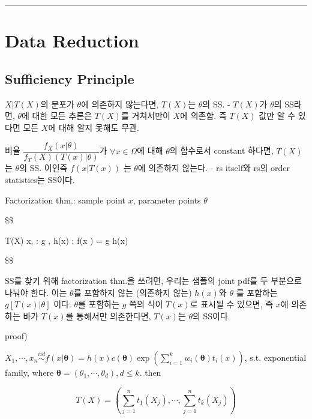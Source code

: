 \documentclass[
]{book}
\begin{document}
\begin{center}\rule{0.5\linewidth}{0.5pt}\end{center}

\hypertarget{data-reduction}{%
\section{Data Reduction}\label{data-reduction}}

\hypertarget{sufficiency-principle}{%
\subsection{Sufficiency Principle}\label{sufficiency-principle}}

\(X \vert T(X)\)의 분포가 \(\theta\)에 의존하지 않는다면, \(T(X)\)는 \(\theta\)의 SS.
- \(T(X)\)가 \(\theta\)의 SS라면, \(\theta\)에 대한 모든 추론은 \(T(X)\)를 거쳐서만이 \(X\)에 의존함. 즉 \(T(X)\) 값만 알 수 있다면 모든 \(X\)에 대해 알지 못해도 무관.

비율 \(\dfrac{f_X(x \vert \theta)}{f_T(X) \left( T(x) \vert \theta \right)}\)가 \(\forall x \in \Omega\)에 대해 \(\theta\)의 함수로서 constant 하다면, \(T(X)\)는 \(\theta\)의 SS. 이인즉 \(f(x \vert T(x))\) 는 \(\theta\)에 의존하지 않는다.
- rs itself와 rs의 order statistics는 SS이다.

Factorization thm.: sample point \(x\), parameter points \(\theta\)

\$\$

T(X)  \iff \forall x, \theta: g , h(x) : f(x \vert \theta) = g  \ast h(x)

\$\$

SS를 찾기 위해 factorization thm.을 쓰려면, 우리는 샘플의 joint pdf를 두 부분으로 나눠야 한다. 이는 \(\theta\)를 포함하지 않는 (의존하지 않는) \(h(x)\)와 \(\theta\) 를 포함하는 \(g \left[ T(x) \vert \theta \right]\) 이다. \(\theta\)를 포함하는 \(g\) 쪽의 식이 \(T(x)\)로 표시될 수 있으면, 즉 \(x\)에 의존하는 바가 \(T(x)\)를 통해서만 의존한다면, \(T(x)\)는 \(\theta\)의 SS이다.

proof)

\(X_1 , \cdots, x_n \overset {iid} {\sim} f(x \vert \pmb \theta) = h(x)c(\pmb \theta) \exp \left( \sum_{i=1}^k w_i (\pmb \theta)t_i(x) \right)\), s.t. exponential family, where \(\pmb \theta = (\theta_1 , \cdots, \theta_d), d \le k\). then

\[
T(X) = \left( \sum_{j=1}^n t_1 (X_j) , \cdots, \sum_{j=1}^n t_k (X_j) \right)
\]
\end{document}
